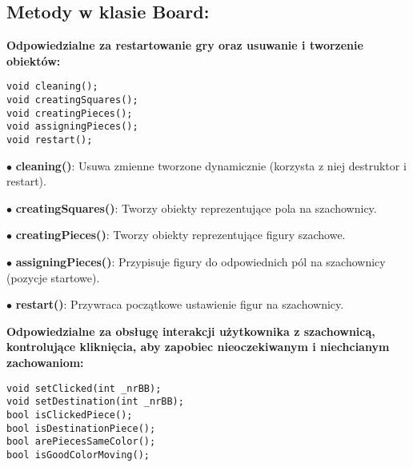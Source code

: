 \documentclass[]{report}
\begin{document}
\subsection*{Metody w klasie Board:}

\textbf{Odpowiedzialne za restartowanie gry oraz usuwanie i tworzenie obiektów:}

\begin{lstlisting}
void cleaning();
void creatingSquares();
void creatingPieces();
void assigningPieces();
void restart();
\end{lstlisting}
\begin{flushleft}
$\bullet$ \textbf{cleaning()}: Usuwa zmienne tworzone dynamicznie (korzysta z niej destruktor i restart).

$\bullet$ \textbf{creatingSquares()}: Tworzy obiekty reprezentujące pola na szachownicy.

$\bullet$ \textbf{creatingPieces()}: Tworzy obiekty reprezentujące figury szachowe.

$\bullet$ \textbf{assigningPieces()}: Przypisuje figury do odpowiednich pól na szachownicy (pozycje startowe).

$\bullet$ \textbf{restart()}: Przywraca początkowe ustawienie figur na szachownicy.

\textbf{Odpowiedzialne za obsługę interakcji użytkownika z szachownicą, kontrolujące kliknięcia, aby zapobiec nieoczekiwanym i niechcianym zachowaniom:}
\end{flushleft}
\begin{lstlisting}
void setClicked(int _nrBB);
void setDestination(int _nrBB);
bool isClickedPiece();
bool isDestinationPiece();
bool arePiecesSameColor();
bool isGoodColorMoving();
\end{lstlisting}
\end{document}
